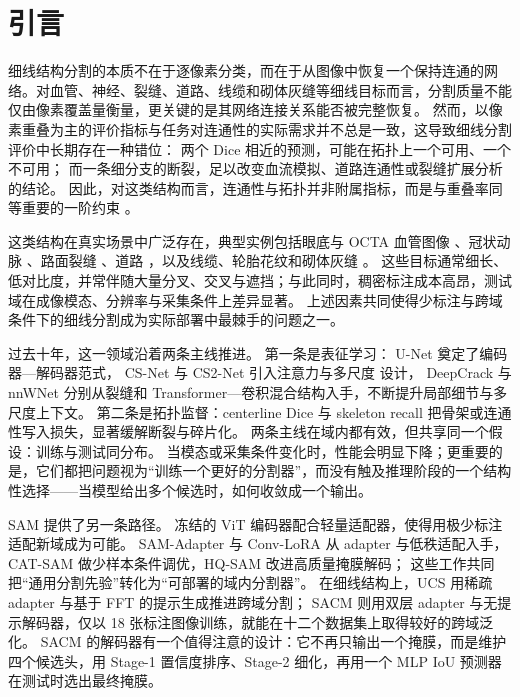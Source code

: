 
\section{引言}
\label{sec:intro_zh}

细线结构分割的本质不在于逐像素分类，而在于从图像中恢复一个保持连通的网络。对血管、神经、裂缝、道路、线缆和砌体灰缝等细线目标而言，分割质量不能仅由像素覆盖量衡量，更关键的是其网络连接关系能否被完整恢复。
然而，以像素重叠为主的评价指标与任务对连通性的实际需求并不总是一致，这导致细线分割评价中长期存在一种错位：
两个 Dice 相近的预测，可能在拓扑上一个可用、一个不可用；
而一条细分支的断裂，足以改变血流模拟、道路连通性或裂缝扩展分析的结论。
因此，对这类结构而言，连通性与拓扑并非附属指标，而是与重叠率同等重要的一阶约束 \cite{shit2021cldice,kirchhoff2024skeletonrecall}。

这类结构在真实场景中广泛存在，典型实例包括眼底与 OCTA 血管图像 \cite{staal2004drive,hoover2000stare,budai2013robust,li2024octa500}、冠状动脉 \cite{cervantes2019dca1}、路面裂缝 \cite{liu2019deepcrack}、道路 \cite{mnih2013machine}，以及线缆、轮胎花纹和砌体灰缝 \cite{zhu2026sacm,valverde2025topomortar}。
这些目标通常细长、低对比度，并常伴随大量分叉、交叉与遮挡；与此同时，稠密标注成本高昂，测试域在成像模态、分辨率与采集条件上差异显著。
上述因素共同使得少标注与跨域条件下的细线分割成为实际部署中最棘手的问题之一。



过去十年，这一领域沿着两条主线推进。
第一条是表征学习：
U-Net \cite{ronneberger2015unet} 奠定了编码器—解码器范式，
CS-Net \cite{mou2019csnet} 与 CS2-Net \cite{mou2021cs2net} 引入注意力与多尺度 设计，
DeepCrack \cite{liu2019deepcrack} 与 nnWNet \cite{zhou2025nnwnet} 分别从裂缝和 Transformer—卷积混合结构入手，不断提升局部细节与多尺度上下文。
第二条是拓扑监督：centerline Dice \cite{shit2021cldice} 与 skeleton recall \cite{kirchhoff2024skeletonrecall} 把骨架或连通性写入损失，显著缓解断裂与碎片化。
两条主线在域内都有效，但共享同一个假设：训练与测试同分布。
当模态或采集条件变化时，性能会明显下降；更重要的是，它们都把问题视为“训练一个更好的分割器”，而没有触及推理阶段的一个结构性选择——当模型给出多个候选时，如何收敛成一个输出。




SAM \cite{kirillov2023sam} 提供了另一条路径。
冻结的 ViT 编码器配合轻量适配器，使得用极少标注适配新域成为可能。
SAM-Adapter \cite{chen2023samadapter} 与 Conv-LoRA \cite{zhong2024convlora} 从 adapter 与低秩适配入手，
CAT-SAM \cite{xiao2024catsam} 做少样本条件调优，HQ-SAM \cite{ke2023hqsam} 改进高质量掩膜解码；
这些工作共同把“通用分割先验”转化为“可部署的域内分割器”。
在细线结构上，UCS \cite{zhu2025ucs} 用稀疏 adapter 与基于 FFT 的提示生成推进跨域分割；
SACM \cite{zhu2026sacm} 则用双层 adapter 与无提示解码器，仅以 18 张标注图像训练，就能在十二个数据集上取得较好的跨域泛化。
SACM 的解码器有一个值得注意的设计：它不再只输出一个掩膜，而是维护四个候选头，用 Stage-1 置信度排序、Stage-2 细化，再用一个 MLP IoU 预测器在测试时选出最终掩膜。

